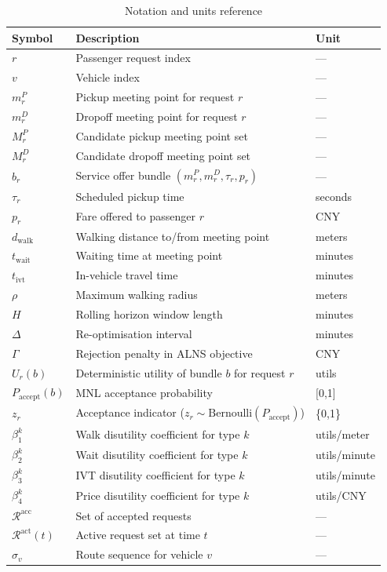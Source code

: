 \documentclass[review,12pt]{elsarticle}
\begin{document}
\begin{table}[h]
\centering
\caption{Notation and units reference}
\label{tab:notation}
\begin{tabular}{lll}
\toprule
Symbol & Description & Unit \\
\midrule
$r$ & Passenger request index & --- \\
$v$ & Vehicle index & --- \\
$m_r^P$ & Pickup meeting point for request $r$ & --- \\
$m_r^D$ & Dropoff meeting point for request $r$ & --- \\
$M_r^P$ & Candidate pickup meeting point set & --- \\
$M_r^D$ & Candidate dropoff meeting point set & --- \\
$b_r$ & Service offer bundle $(m_r^P, m_r^D, \tau_r, p_r)$ & --- \\
$\tau_r$ & Scheduled pickup time & seconds \\
$p_r$ & Fare offered to passenger $r$ & CNY \\
$d_{\text{walk}}$ & Walking distance to/from meeting point & meters \\
$t_{\text{wait}}$ & Waiting time at meeting point & minutes \\
$t_{\text{ivt}}$ & In-vehicle travel time & minutes \\
$\rho$ & Maximum walking radius & meters \\
$H$ & Rolling horizon window length & minutes \\
$\Delta$ & Re-optimisation interval & minutes \\
$\Gamma$ & Rejection penalty in ALNS objective & CNY \\
$U_r(b)$ & Deterministic utility of bundle $b$ for request $r$ & utils \\
$P_{\text{accept}}(b)$ & MNL acceptance probability & [0,1] \\
$z_r$ & Acceptance indicator ($z_r \sim \text{Bernoulli}(P_{\text{accept}})$) & \{0,1\} \\
$\beta_1^k$ & Walk disutility coefficient for type $k$ & utils/meter \\
$\beta_2^k$ & Wait disutility coefficient for type $k$ & utils/minute \\
$\beta_3^k$ & IVT disutility coefficient for type $k$ & utils/minute \\
$\beta_4^k$ & Price disutility coefficient for type $k$ & utils/CNY \\
$\mathcal{R}^{\text{acc}}$ & Set of accepted requests & --- \\
$\mathcal{R}^{\text{act}}(t)$ & Active request set at time $t$ & --- \\
$\sigma_v$ & Route sequence for vehicle $v$ & --- \\
\bottomrule
\end{tabular}
\end{table}
\end{document}
